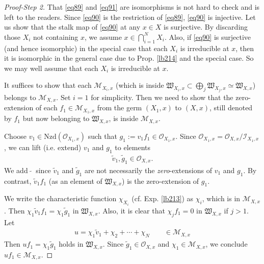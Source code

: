 \documentclass[12pt,b5paper,notitlepage]{report}
\theoremstyle{definition}
\theoremstyle{plain}
\newcommand{\fk}{\mathfrak}
\newcommand{\wtd}{\widetilde}
\newcommand{\scr}{\mathscr}
\newcommand{\Nzd}{\mathrm{Nzd}}
\numberwithin{equation}{section}
\begin{document}
\begin{proof}[Proof-Step 2]
That \eqref{eq89} and \eqref{eq91} are isomorphisms is not hard to check and is left to the readers. Since \eqref{eq90} is the restriction of \eqref{eq89}, \eqref{eq90} is injective. Let us show that the stalk map of \eqref{eq90} at any $x\in X$ is surjective. By discarding those $X_i$ not containing $x$, we assume $x\in\bigcap_{i=1}^N X_i$. Also, if \eqref{eq90} is surjective (and hence isomorphic) in the special case that each $X_i$ is irreducible at $x$, then it is isomorphic in the general case due to Prop. \ref{lb214} and the special case. So we may well assume that each $X_i$ is irreducible at $x$.

It suffices to show that each $\scr M_{X_i,x}$ (which is inside $\fk W_{X_i,x}\subset\bigoplus_j \fk W_{X_j,x}\simeq\fk W_{X,x}$) belongs to $\scr M_{X,x}$. Set $i=1$ for simplicity. Then we need to show that the zero-extension of each $f_1\in\scr M_{X_1,x}$ from the germ $(X_1,x)$ to $(X,x)$, still denoted by $f_1$ but now belonging to $\fk W_{X,x}$, is inside $\scr M_{X,x}$.



Choose $v_1\in\Nzd(\scr O_{X_1,x})$ such that $g_1:=v_1f_1\in\scr O_{X_1,x}$. Since $\scr O_{X_1,x}=\scr O_{X,x}/\scr I_{X_1,x}$, we can lift (i.e. extend) $v_1$ and $g_1$ to elements
\begin{align*}
\wtd v_1,\wtd g_1\in\scr O_{X,x}.
\end{align*}
We add $\wtd{~~}$ since $\wtd v_1$ and $\wtd g_1$ are not necessarily the \textit{zero}-extensions of $v_1$ and $g_1$. By contrast, $\wtd v_1f_1$ (as an element of $\fk W_{X,x}$) is the zero-extension of $g_1$.

We write the characteristic function $\chi_{X_i}$ (cf. Exp. \ref{lb213}) as $\chi_i$, which is in $\scr M_{X,x}$. Then $\chi_1\wtd v_1f_1=\chi_1\wtd g_1$ in $\fk W_{X,x}$. Also, it is clear that $\chi_jf_1=0$ in $\fk W_{X,x}$ if $j>1$. Let
\begin{align*}
u=\chi_1\wtd v_1+\chi_2+\cdots+\chi_N\qquad \in\scr M_{X,x}
\end{align*}
Then $uf_1=\chi_1\wtd g_1$ holds in $\fk W_{X,x}$. Since $\wtd g_1\in\scr O_{X,x}$ and $\chi_1\in\scr M_{X,x}$, we conclude $uf_1\in\scr M_{X,x}$.




\end{proof}
\end{document}
